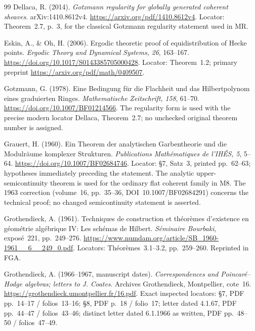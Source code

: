 \begin{thebibliography}{99}
Dellaca, R. (2014). \emph{Gotzmann regularity for globally generated coherent sheaves}. arXiv:1410.8612v4. \url{https://arxiv.org/pdf/1410.8612v4}. Locator: Theorem~2.7, p.~3, for the classical Gotzmann regularity statement used in MR.

Eskin, A., \& Oh, H. (2006). Ergodic theoretic proof of equidistribution of Hecke points. \emph{Ergodic Theory and Dynamical Systems, 26}, 163--167. \url{https://doi.org/10.1017/S0143385705000428}. Locator: Theorem~1.2; primary preprint \url{https://arxiv.org/pdf/math/0409507}.

Gotzmann, G. (1978). Eine Bedingung f\"ur die Flachheit und das Hilbertpolynom eines graduierten Ringes. \emph{Mathematische Zeitschrift, 158}, 61--70. \url{https://doi.org/10.1007/BF01214566}. The regularity form is used with the precise modern locator Dellaca, Theorem~2.7; no unchecked original theorem number is assigned.

Grauert, H. (1960). Ein Theorem der analytischen Garbentheorie und die Modulr\"aume komplexer Strukturen. \emph{Publications Math\'ematiques de l'IH\'ES, 5}, 5--64. \url{https://doi.org/10.1007/BF02684746}. Locator: \S7, Satz~3, printed pp.~62--63; hypotheses immediately preceding the statement. The analytic upper-semicontinuity theorem is used for the ordinary flat coherent family in M8. The 1963 correction (volume~16, pp.~35--36, DOI~10.1007/BF02684291) concerns the technical proof; no changed semicontinuity statement is asserted.

Grothendieck, A. (1961). Techniques de construction et th\'eor\`emes d'existence en g\'eom\'etrie alg\'ebrique IV: Les sch\'emas de Hilbert. \emph{S\'eminaire Bourbaki}, expos\'e~221, pp.~249--276. \url{https://www.numdam.org/article/SB_1960-1961__6__249_0.pdf}. Locators: Th\'eor\`emes~3.1--3.2, pp.~259--260. Reprinted in FGA.

Grothendieck, A. (1966--1967, manuscript dates). \emph{Correspondences and Poincar\'e--Hodge algebras; letters to J. Coates}. Archives Grothendieck, Montpellier, cote~16. \url{https://grothendieck.umontpellier.fr/16.pdf}. Exact inspected locators: \S7, PDF pp.~14--17 / folios~13--16; \S8, PDF p.~18 / folio~17; letter dated 4.1.67, PDF pp.~44--47 / folios~43--46; distinct letter dated 6.1.1966 as written, PDF pp.~48--50 / folios~47--49.


\end{thebibliography}
